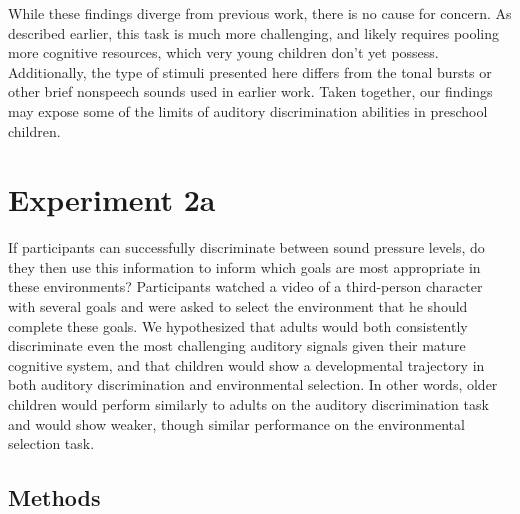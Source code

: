 \documentclass[10pt, letterpaper]{article}
\begin{document}
While these findings diverge from previous work, there is no cause for
concern. As described earlier, this task is much more challenging, and
likely requires pooling more cognitive resources, which very young
children don't yet possess. Additionally, the type of stimuli presented
here differs from the tonal bursts or other brief nonspeech sounds used
in earlier work. Taken together, our findings may expose some of the
limits of auditory discrimination abilities in preschool children.

\hypertarget{experiment-2a}{%
\section{\texorpdfstring{\textbf{Experiment
2a}}{Experiment 2a}}\label{experiment-2a}}

If participants can successfully discriminate between sound pressure
levels, do they then use this information to inform which goals are most
appropriate in these environments? Participants watched a video of a
third-person character with several goals and were asked to select the
environment that he should complete these goals. We hypothesized that
adults would both consistently discriminate even the most challenging
auditory signals given their mature cognitive system, and that children
would show a developmental trajectory in both auditory discrimination
and environmental selection. In other words, older children would
perform similarly to adults on the auditory discrimination task and
would show weaker, though similar performance on the environmental
selection task.

\hypertarget{methods-2}{%
\subsection{\texorpdfstring{\textbf{Methods}}{Methods}}\label{methods-2}}
\end{document}
